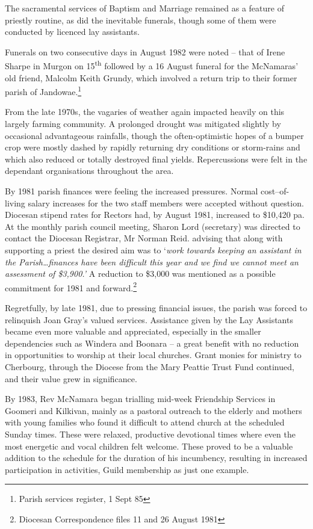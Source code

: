 The sacramental services of Baptism and Marriage remained as a feature of priestly routine, as did the inevitable funerals, though some of them were conducted by licenced lay assistants.



Funerals on two consecutive days in August 1982 were noted -- that of Irene Sharpe in Murgon on 15\textsuperscript{th} followed by a 16 August funeral for the McNamaras' old friend, Malcolm Keith Grundy, which involved a return trip to their former parish of Jandowae.\footnote{Parish services register, 1 Sept 85}


From the late 1970s, the vagaries of weather again impacted heavily on this largely farming community. A prolonged drought was mitigated slightly by occasional advantageous rainfalls, though the often-optimistic hopes of a bumper crop were mostly dashed by rapidly returning dry conditions or storm-rains and which also reduced or totally destroyed final yields. Repercussions were felt in the dependant organisations throughout the area.



By 1981 parish finances were feeling the increased pressures. Normal cost--of-living salary increases for the two staff members were accepted without question. Diocesan stipend rates for Rectors had, by August 1981, increased to \$10,420 pa. At the monthly parish council meeting, Sharon Lord (secretary) was directed to contact the Diocesan Registrar, Mr Norman Reid. advising that along with supporting a priest the desired aim was to `\emph{work towards keeping an assistant in the Parish\ldots finances have been difficult this year and we find we cannot meet an assessment of \$3,900.'} A reduction to \$3,000 was mentioned as a possible commitment for 1981 and forward.\footnote{Diocesan Correspondence files 11 and 26 August 1981}


Regretfully, by late 1981, due to pressing financial issues, the parish was forced to relinquish Joan Gray's valued services. Assistance given by the Lay Assistants became even more valuable and appreciated, especially in the smaller dependencies such as Windera and Boonara -- a great benefit with no reduction in opportunities to worship at their local churches. Grant monies for ministry to Cherbourg, through the Diocese from the Mary Peattie Trust Fund continued, and their value grew in significance.



By 1983, Rev McNamara began trialling mid-week Friendship Services in Goomeri and Kilkivan, mainly as a pastoral outreach to the elderly and mothers with young families who found it difficult to attend church at the scheduled Sunday times. These were relaxed, productive devotional times where even the most energetic and vocal children felt welcome. These proved to be a valuable addition to the schedule for the duration of his incumbency, resulting in increased participation in activities, Guild membership as just one example.



